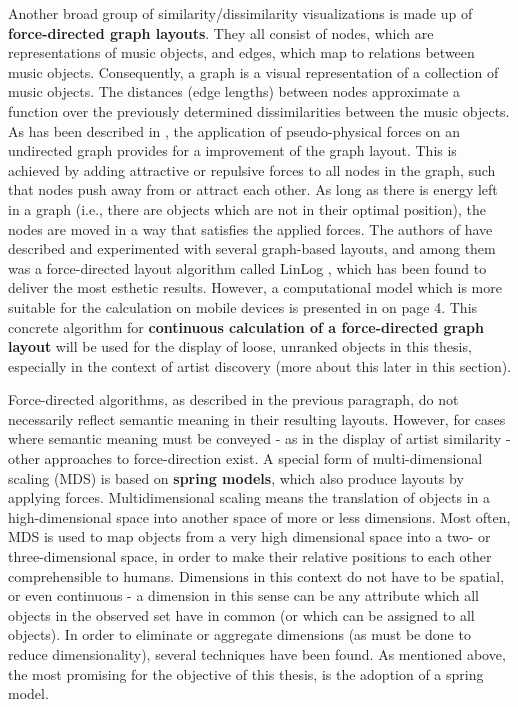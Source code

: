 Another broad group of similarity/dissimilarity visualizations is made up of \textbf{force-directed graph layouts}. They all consist of nodes, which are representations of music objects, and edges, which map to relations between music objects. Consequently, a graph is a visual representation of a collection of music objects. The distances (edge lengths) between nodes approximate a function over the previously determined dissimilarities between the music objects. As has been described in \cite{gansner:1998}, the application of pseudo-physical forces on an undirected graph provides for a improvement of the graph layout. This is achieved by adding attractive or repulsive forces to all nodes in the graph, such that nodes push away from or attract each other. As long as there is energy left in a graph (i.e., there are objects which are not in their optimal position), the nodes are moved in a way that satisfies the applied forces. The authors of \cite{Muelder:2010fk} have described and experimented with several graph-based layouts, and among them was a force-directed layout algorithm called LinLog \cite{noack:2003}, which has been found to deliver the most esthetic results. However, a computational model which is more suitable for the calculation on mobile devices is presented in \cite{Kobourov04} on page 4. This concrete algorithm for \textbf{continuous calculation of a force-directed graph layout} will be used for the display of loose, unranked objects in this thesis, especially in the context of artist discovery (more about this later in this section).

Force-directed algorithms, as described in the previous paragraph, do not necessarily reflect semantic meaning in their resulting layouts. However, for cases where semantic meaning must be conveyed - as in the display of artist similarity - other approaches to force-direction exist. A special form of multi-dimensional scaling (MDS) is based on \textbf{spring models}, which also produce layouts by applying forces.
Multidimensional scaling means the translation of objects in a high-dimensional space into another space of more or less dimensions. Most often, MDS is used to map objects from a very high dimensional space into a two- or three-dimensional space, in order to make their relative positions to each other comprehensible to humans. Dimensions in this context do not have to be spatial, or even continuous - a dimension in this sense can be any attribute which all objects in the observed set have in common (or which can be assigned to all objects). In order to eliminate or aggregate dimensions (as must be done to reduce dimensionality), several techniques have been found.
As mentioned above, the most promising for the objective of this thesis, is the adoption of a spring model.

